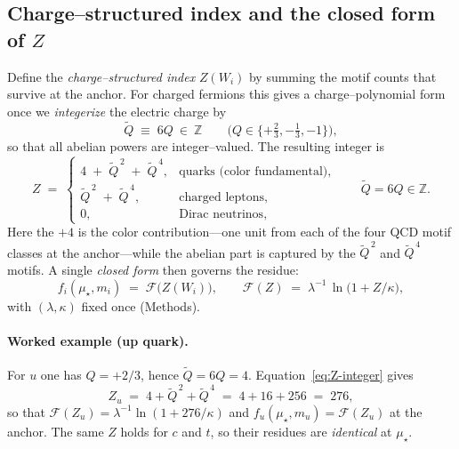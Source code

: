 \documentclass[epjc3]{svjour3}
\begin{document}
\subsection{Charge--structured index and the closed form of $Z$}\label{sec:word-charge}
Define the \emph{charge--structured index} $Z(W_i)$ by summing the motif counts that survive at the anchor. For charged fermions this gives a charge--polynomial form once we \emph{integerize} the electric charge by
\[
  \tilde Q\;\equiv\;6Q\ \in\ \mathbb Z
  \qquad\bigl(Q\in\{+{\tfrac23},-{\tfrac13},-1\}\bigr),
\]
so that all abelian powers are integer--valued. The resulting integer is
\begin{equation}
  Z\;=\;
  \begin{cases}
    4\;+\;\tilde Q^{\,2}\;+\;\tilde Q^{\,4}, & \text{quarks (color fundamental)},\\[3pt]
    \tilde Q^{\,2}\;+\;\tilde Q^{\,4},       & \text{charged leptons},\\[3pt]
    0,                                       & \text{Dirac neutrinos},
  \end{cases}
  \qquad \tilde Q=6Q\in\mathbb Z.
  \label{eq:Z-integer}
\end{equation}
Here the $+4$ is the color contribution—one unit from each of the four QCD motif classes at the anchor—while the abelian part is captured by the $\tilde Q^{\,2}$ and $\tilde Q^{\,4}$ motifs. A single \emph{closed form} then governs the residue:
\begin{equation}
  f_i(\mu_\star,m_i)\;=\;\mathcal F\!\bigl(Z(W_i)\bigr),
  \qquad
  \mathcal F(Z)\;=\;\lambda^{-1}\,\ln\!\bigl(1+Z/\kappa\bigr),
  \label{eq:gap-closed-form}
\end{equation}
with $(\lambda,\kappa)$ fixed once (Methods). %

\paragraph{Worked example (up quark).}
For $u$ one has $Q=+2/3$, hence $\tilde Q=6Q=4$. Equation~\eqref{eq:Z-integer} gives
\[
  Z_u\;=\;4+\tilde Q^{\,2}+\tilde Q^{\,4}\;=\;4+16+256\;=\;276,
\]
so that $\mathcal F(Z_u)=\lambda^{-1}\ln(1+276/\kappa)$ and $f_u(\mu_\star,m_u)=\mathcal F(Z_u)$ at the anchor. The same $Z$ holds for $c$ and $t$, so their residues are \emph{identical} at $\mu_\star$. %
\end{document}
